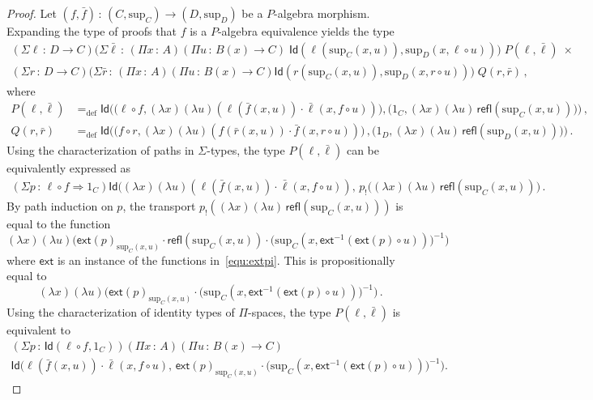 \documentclass[10pt,a4paper,oneside,reqno]{amsart}
\numberwithin{equation}{section}
\theoremstyle{mythm}
\theoremstyle{mydef}
\theoremstyle{myrmk}
\newcommand{\defeq}{=_{\mathrm{def}}}
\newcommand{\co}{\,{:}\,}
\newcommand{\com}{\circ}
\newcommand{\ct}{\cdot}
\newcommand{\ext}{\mathsf{ext}}
\newcommand{\Id}{\mathsf{Id}}
\newcommand{\refl}{\mathsf{refl}}
\renewcommand{\sup}{\mathrm{sup}}
\begin{document}
\begin{proof} Let $(f, \bar{f}) \co (C, \sup_C) \to (D, \sup_D)$ be a  $P$-algebra morphism. Expanding the type of proofs that $f$ is a 
$P$-algebra equivalence yields the type
\begin{multline*}
	 (\Sigma \ell \co D \to C) 
	 \big( \Sigma \bar{\ell} \co  (\Pi x \co A)( \Pi u \co B(x) \to C) \; 
	 \Id( \ell (\sup_C(x,u)),  \sup_D(x, \ell \circ u)) \big) \; 
 		P(\ell, \bar{\ell}) \; \times
	 \\
	 (\Sigma r \co D \to C) 
	 \big(\Sigma \bar{r} \co (\Pi x \co A) (\Pi u \co B(x) \to C) \Id( r (\sup_C(x,u)), \sup_D(x, r \circ u))\big)
	 \;  Q(r, \bar{r}) \, , 
\end{multline*}
where
\begin{align*}
P(\ell,\bar{\ell}) & 
\defeq 
\Id \Big( \big( \ell \com f, (\lambda x)(\lambda u) (\ell(\bar{f}(x,u)) \ct \bar{\ell}(x, f \com u))\big), \big( 1_C, (\lambda x)(\lambda u) \,  \refl(\sup_C(x,u))\big) \Big)  \, , \\
Q(r,\bar{r})    & \defeq \Id \Big( \big( f \com r, (\lambda x)(\lambda u) (f(\bar{r}(x,u)) \ct \bar{f}(x, r \com u))\big) \, , \big( 1_D, (\lambda x)(\lambda u) \, \refl(\sup_D(x,u)) \big) \Big) \, .
\end{align*}
Using the characterization of paths in $\Sigma$-types, the type $P(\ell,\bar{\ell})$ can be equivalently expressed as
\begin{align*}
(\Sigma p \co \ell \com f \Rightarrow 1{_C}) 
	\Id\big((\lambda x) (\lambda u) (\ell(\bar{f}(x,u)) \ct \bar{\ell}(x, f \com u)) ,\, p_{!}((\lambda x) (\lambda u) \, \refl(\sup_C(x,u)) \big) \,.
\end{align*}
By path induction on $p$, the transport $p_{!} ((\lambda x) (\lambda u) \, \refl(\sup_C(x,u)))$ is equal to the function
\[
 (\lambda x) 
 (\lambda u) 
 \big( 
 \ext(p)_{\sup_C(x,u)} \ct \refl(\sup_C(x,u)) \ct \big(\sup_C(x, \ext^{-1}(\ext(p) \circ u))\big)^{-1}
 \big) 
 \]
where $\ext$ is an instance of the functions  in~\eqref{equ:extpi}. 
This is propositionally equal to
\[ 
(\lambda x)
(\lambda u)
\big( 
\ext(p)_{\sup_C(x,u)} \ct \big(\sup_C(x, \ext^{-1}(\ext(p) \circ u))\big)^{-1}
\big) \, .
\]
Using the characterization of identity types of $\Pi$-spaces, the type $P(\ell,\bar{\ell})$ is equivalent to
\begin{multline*} 
(\Sigma p \co  \Id( \ell \com f , 1{_C}))
(\Pi x \co A) 
(\Pi u \co B(x) \to  C) \\
	\Id\Big(\ell(\bar{f}(x,u)) \ct \bar{\ell}(x, f \com u),\, \ext(p)_{\sup_C(x,u)} \ct \big(\sup_C(x, \ext^{-1}(\ext(p) \circ u))\big)^{-1}\Big).

\end{multline*}
\end{proof}
\end{document}
